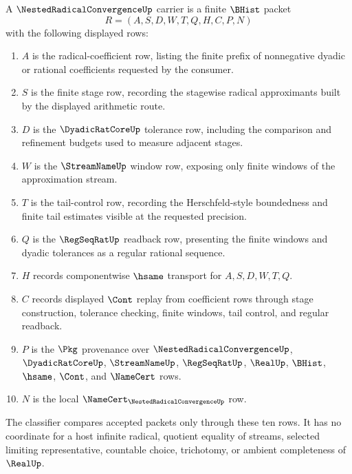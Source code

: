 \begin{definition}
\label{def:nested-radical-convergence-carrier}
A $\NestedRadicalConvergenceUp$ carrier is a finite $\BHist$ packet
$$
R=(A,S,D,W,T,Q,H,C,P,N)
$$
with the following displayed rows:
\begin{enumerate}
\item $A$ is the radical-coefficient row, listing the finite prefix of nonnegative dyadic or rational coefficients requested by the consumer.
\item $S$ is the finite stage row, recording the stagewise radical approximants built by the displayed arithmetic route.
\item $D$ is the $\DyadicRatCoreUp$ tolerance row, including the comparison and refinement budgets used to measure adjacent stages.
\item $W$ is the $\StreamNameUp$ window row, exposing only finite windows of the approximation stream.
\item $T$ is the tail-control row, recording the Herschfeld-style boundedness and finite tail estimates visible at the requested precision.
\item $Q$ is the $\RegSeqRatUp$ readback row, presenting the finite windows and dyadic tolerances as a regular rational sequence.
\item $H$ records componentwise $\hsame$ transport for $A,S,D,W,T,Q$.
\item $C$ records displayed $\Cont$ replay from coefficient rows through stage construction, tolerance checking, finite windows, tail control, and regular readback.
\item $P$ is the $\Pkg$ provenance over $\NestedRadicalConvergenceUp$, $\DyadicRatCoreUp$, $\StreamNameUp$, $\RegSeqRatUp$, $\RealUp$, $\BHist$, $\hsame$, $\Cont$, and $\NameCert$ rows.
\item $N$ is the local $\NameCert_{\NestedRadicalConvergenceUp}$ row.
\end{enumerate}
The classifier compares accepted packets only through these ten rows. It has no coordinate for a host infinite radical, quotient equality of streams, selected limiting representative, countable choice, trichotomy, or ambient completeness of $\RealUp$.
\end{definition}

